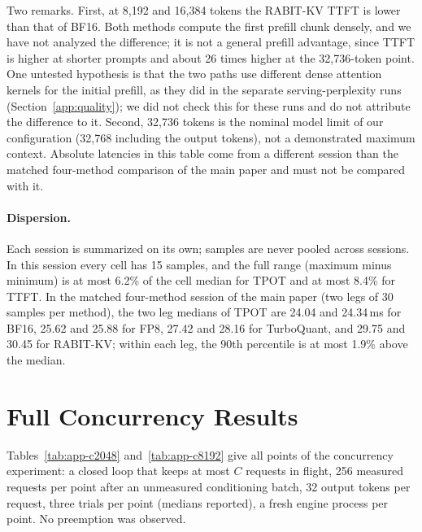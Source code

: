 \documentclass{article}
\begin{document}
Two remarks. First, at 8,192 and 16,384 tokens the RABIT-KV TTFT is lower than that of BF16. Both
methods compute the first prefill chunk densely, and we have not analyzed the difference; it is not a
general prefill advantage, since TTFT is higher at shorter prompts and about 26 times higher at the
32,736-token point. One untested hypothesis is that the two paths use different dense attention
kernels for the initial prefill, as they did in the separate serving-perplexity runs
(Section~\ref{app:quality}); we did not check this for these runs and do not attribute the difference to it. Second, 32,736 tokens is the nominal model limit of our configuration (32,768
including the output tokens), not a demonstrated maximum context. Absolute latencies in this table come
from a different session than the matched four-method comparison of the main paper and must not be
compared with it.

\paragraph{Dispersion.}
Each session is summarized on its own; samples are never pooled across sessions. In this session every
cell has 15 samples, and the full range (maximum minus minimum) is at most 6.2\% of the cell median for
TPOT and at most 8.4\% for TTFT. In the matched four-method session of the main paper (two legs of 30
samples per method), the two leg medians of TPOT are 24.04 and 24.34\,ms for BF16, 25.62 and 25.88 for
FP8, 27.42 and 28.16 for TurboQuant, and 29.75 and 30.45 for RABIT-KV; within each leg, the 90th
percentile is at most 1.9\% above the median.

\section{Full Concurrency Results}
\label{app:concurrency}

Tables~\ref{tab:app-c2048} and~\ref{tab:app-c8192} give all points of the concurrency experiment: a
closed loop that keeps at most $C$ requests in flight, 256 measured requests per point after an
unmeasured conditioning batch, 32 output tokens per request, three trials per point (medians reported),
a fresh engine process per point. No preemption was observed.
\end{document}

